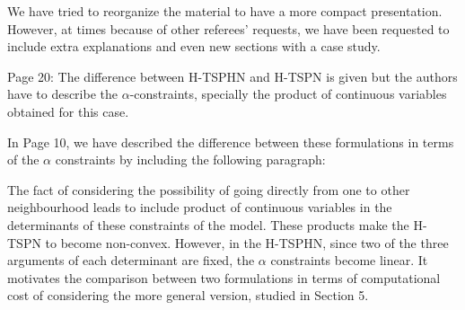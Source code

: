 \documentclass{article}
\newenvironment{reviewer}{\setcounter{pointcounter}{1}}{}
\newcommand{\point}{\text{{\selectfont \thepointcounter} \stepcounter{pointcounter}}}
\begin{document}
\begin{reviewer}
		\begin{tcolorbox}[breakable,enhanced,coltitle=black,colback=red!5!white,colframe=red!75!black,title=\textbf{Answer R1.\point},borderline={1pt}{0pt}{black},boxrule=0pt]
	We have tried to reorganize the material to have a more compact presentation. However, at times because of other referees' requests, we have been requested to include extra explanations and even new sections with a case study.
		\end{tcolorbox}
		
		\begin{itshape}
			Page 20: The difference between H-TSPHN and H-TSPN is given but the authors have to describe the $\alpha$-constraints, specially the product of continuous variables obtained for this case.
		\end{itshape}
		
		\begin{tcolorbox}[breakable,enhanced,coltitle=black,colback=red!5!white,colframe=red!75!black,title=\textbf{Answer R1.\point},borderline={1pt}{0pt}{black},boxrule=0pt]
		In Page 10, we have described the difference between these formulations in terms of the $\alpha$ constraints by including the following paragraph:
		
		\medskip
		
		The fact of considering the possibility of going directly from one to other neighbourhood leads to include product of continuous variables in the determinants of these constraints of the model. These products make the H-TSPN to become non-convex. However, in the H-TSPHN, since two of the three arguments of each determinant are fixed, the $\alpha$ constraints become linear. It motivates the comparison between two formulations in terms of computational cost of considering the more general version, studied in Section 5.
		\end{tcolorbox}
		

\end{reviewer}
\end{document}
